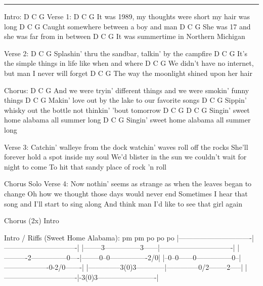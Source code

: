 \noindent\rule{\columnwidth}{1pt}

\begin{lstsong}
Intro: D  C  G
Verse 1:
       D  C                   G
It was 1989, my thoughts were short my hair was long
D                  C               G
Caught somewhere between a boy and man
D        C             G
She was 17 and she was far from in between
       D             C        G
It was summertime in Northern Michigan

Verse 2:
   D               C         G    
Splashin' thru the sandbar, talkin' by the campfire
          D                C                  G 
It's the simple things in life like when and where
    D             C             G
We didn't have no internet, but man I never will forget
    D                 C               G
The way the moonlight shined upon her hair

Chorus:
            D                C                  G
And we were tryin' different things and we were smokin' funny things
       D               C                    G
Makin' love out by the lake to our favorite songs
        D              C          G
Sippin' whisky out the bottle not thinkin' 'bout tomorrow
        D             C        G            D  C  G
Singin' sweet home alabama all summer long
        D             C        G
Singin' sweet home alabama all summer long

Verse 3:
Catchin' walleye from the dock watchin' waves roll off the rocks
She'll forever hold a spot inside my soul
We'd blister in the sun we couldn't wait for night to come
To hit that sandy place of rock 'n roll

Chorus
Solo
Verse 4:
Now nothin' seems as strange as when the leaves began to change
Oh how we thought those days would never end
Sometimes I hear that song and I'll start to sing along
And think man I'd like to see that girl again

Chorus (2x)
Intro
\end{lstsong}

\begin{lsttab}
Intro / Riffs (Sweet Home Alabama):
                pm                 pm          po     po     po 
|-------------------------------|-------------------------------|
|--------3---------------3------|-------------------------------|
|----------2---------------0----|--------0--0----------------2/0|
|--0--0------0---------------0--|-------------------0-2/0-------|
|--------------3(0)3------------|--------------0/2--------2-----|
|-------------------------------|-3(0)3-------------------------|
\end{lsttab}

